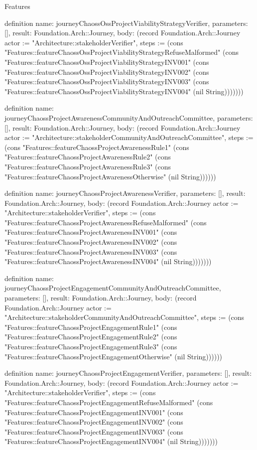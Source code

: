 \begin{lexlean}{Features}
\begin{semanticmodule}
definition{
  name: journeyChaossOssProjectViabilityStrategyVerifier,
  parameters: [],
  result: Foundation.Arch::Journey,
  body: (record Foundation.Arch::Journey {actor := "Architecture::stakeholderVerifier", steps := (cons "Features::featureChaossOssProjectViabilityStrategyRefuseMalformed" (cons "Features::featureChaossOssProjectViabilityStrategyINV001" (cons "Features::featureChaossOssProjectViabilityStrategyINV002" (cons "Features::featureChaossOssProjectViabilityStrategyINV003" (cons "Features::featureChaossOssProjectViabilityStrategyINV004" (nil String))))))})
}

definition{
  name: journeyChaossProjectAwarenessCommunityAndOutreachCommittee,
  parameters: [],
  result: Foundation.Arch::Journey,
  body: (record Foundation.Arch::Journey {actor := "Architecture::stakeholderCommunityAndOutreachCommittee", steps := (cons "Features::featureChaossProjectAwarenessRule1" (cons "Features::featureChaossProjectAwarenessRule2" (cons "Features::featureChaossProjectAwarenessRule3" (cons "Features::featureChaossProjectAwarenessOtherwise" (nil String)))))})
}

definition{
  name: journeyChaossProjectAwarenessVerifier,
  parameters: [],
  result: Foundation.Arch::Journey,
  body: (record Foundation.Arch::Journey {actor := "Architecture::stakeholderVerifier", steps := (cons "Features::featureChaossProjectAwarenessRefuseMalformed" (cons "Features::featureChaossProjectAwarenessINV001" (cons "Features::featureChaossProjectAwarenessINV002" (cons "Features::featureChaossProjectAwarenessINV003" (cons "Features::featureChaossProjectAwarenessINV004" (nil String))))))})
}

definition{
  name: journeyChaossProjectEngagementCommunityAndOutreachCommittee,
  parameters: [],
  result: Foundation.Arch::Journey,
  body: (record Foundation.Arch::Journey {actor := "Architecture::stakeholderCommunityAndOutreachCommittee", steps := (cons "Features::featureChaossProjectEngagementRule1" (cons "Features::featureChaossProjectEngagementRule2" (cons "Features::featureChaossProjectEngagementRule3" (cons "Features::featureChaossProjectEngagementOtherwise" (nil String)))))})
}

definition{
  name: journeyChaossProjectEngagementVerifier,
  parameters: [],
  result: Foundation.Arch::Journey,
  body: (record Foundation.Arch::Journey {actor := "Architecture::stakeholderVerifier", steps := (cons "Features::featureChaossProjectEngagementRefuseMalformed" (cons "Features::featureChaossProjectEngagementINV001" (cons "Features::featureChaossProjectEngagementINV002" (cons "Features::featureChaossProjectEngagementINV003" (cons "Features::featureChaossProjectEngagementINV004" (nil String))))))})
}


\end{semanticmodule}
\end{lexlean}
